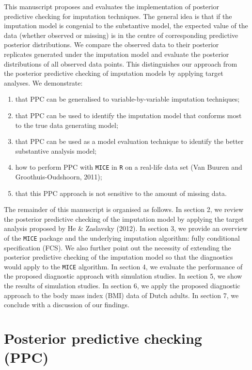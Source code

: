 \documentclass[12pt, fullpage, a4paper]{article}
\begin{document}
This manuscript proposes and evaluates the implementation of posterior predictive checking for imputation techniques. The general idea is that if the imputation model is congenial to the substantive model, the expected value of the data (whether observed or missing) is in the centre of corresponding predictive posterior distributions. We compare the observed data to their posterior replicates generated under the imputation model and evaluate the posterior distributions of all observed data points. This distinguishes our approach from the posterior predictive checking of imputation models by applying target analyses. We demonstrate:
\begin{enumerate}
	\item that PPC can be generalised to variable-by-variable imputation techniques; 
	\item that PPC can be used to identify the imputation model that conforms most to the true data generating model;
	\item that PPC can be used as a model evaluation technique to identify the better substantive analysis model;
	\item how to perform PPC with \texttt{MICE} in \texttt{R} on a real-life data set (Van Buuren and Groothuis-Oudshoorn, 2011\nocite{van2011mice});
	\item that this PPC approach is not sensitive to the amount of missing data.
\end{enumerate}
The remainder of this manuscript is organised as follows. In section 2, we review the posterior predictive checking of the imputation model by applying the target analysis proposed by He \& Zaslavsky (2012)\nocite{he2012diagnosing}. In section 3, we provide an overview of the \texttt{MICE} package and the underlying imputation algorithm: fully conditional specification (FCS). We also further point out the necessity of extending the posterior predictive checking of the imputation model so that the diagnostics would apply to the \texttt{MICE} algorithm. In section 4, we evaluate the performance of the proposed diagnostic approach with simulation studies. In section 5, we show the results of simulation studies. In section 6, we apply the proposed diagnostic approach to the body mass index (BMI) data of Dutch adults. In section 7, we conclude with a discussion of our findings. 


\section{Posterior predictive checking (PPC)}
\end{document}
